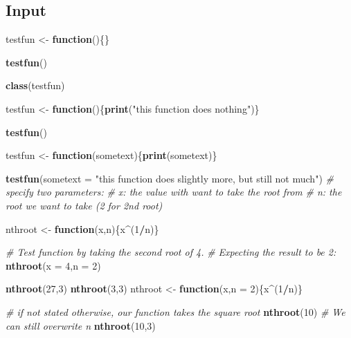 \documentclass[]{book}
\newenvironment{Shaded}{\begin{snugshade}}{\end{snugshade}}
\newcommand{\KeywordTok}[1]{\textcolor[rgb]{0.13,0.29,0.53}{\textbf{#1}}}
\newcommand{\DataTypeTok}[1]{\textcolor[rgb]{0.13,0.29,0.53}{#1}}
\newcommand{\DecValTok}[1]{\textcolor[rgb]{0.00,0.00,0.81}{#1}}
\newcommand{\StringTok}[1]{\textcolor[rgb]{0.31,0.60,0.02}{#1}}
\newcommand{\CommentTok}[1]{\textcolor[rgb]{0.56,0.35,0.01}{\textit{#1}}}
\newcommand{\ControlFlowTok}[1]{\textcolor[rgb]{0.13,0.29,0.53}{\textbf{#1}}}
\newcommand{\OperatorTok}[1]{\textcolor[rgb]{0.81,0.36,0.00}{\textbf{#1}}}
\newcommand{\NormalTok}[1]{#1}
\begin{document}
\subsection{Input}\label{input-5}

\begin{Shaded}
\begin{Highlighting}[]
\NormalTok{testfun <-}\StringTok{ }\ControlFlowTok{function}\NormalTok{()\{\}}

\KeywordTok{testfun}\NormalTok{()}

\KeywordTok{class}\NormalTok{(testfun)}

\NormalTok{testfun <-}\StringTok{ }\ControlFlowTok{function}\NormalTok{()\{}\KeywordTok{print}\NormalTok{(}\StringTok{"this function does nothing"}\NormalTok{)\}}

\KeywordTok{testfun}\NormalTok{()}

\NormalTok{testfun <-}\StringTok{ }\ControlFlowTok{function}\NormalTok{(sometext)\{}\KeywordTok{print}\NormalTok{(sometext)\}}

\KeywordTok{testfun}\NormalTok{(}\DataTypeTok{sometext =} \StringTok{"this function does slightly more, but still not much"}\NormalTok{)}
\CommentTok{# specify two parameters:}
\CommentTok{# x: the value  with want to take the root from}
\CommentTok{# n: the root we want to take (2 for 2nd root)}

\NormalTok{nthroot <-}\StringTok{ }\ControlFlowTok{function}\NormalTok{(x,n)\{x}\OperatorTok{^}\NormalTok{(}\DecValTok{1}\OperatorTok{/}\NormalTok{n)\}}

\CommentTok{# Test function by taking the second root of 4. }
\CommentTok{# Expecting the result to be 2:}
\KeywordTok{nthroot}\NormalTok{(}\DataTypeTok{x =} \DecValTok{4}\NormalTok{,}\DataTypeTok{n =} \DecValTok{2}\NormalTok{)}

\KeywordTok{nthroot}\NormalTok{(}\DecValTok{27}\NormalTok{,}\DecValTok{3}\NormalTok{)}
\KeywordTok{nthroot}\NormalTok{(}\DecValTok{3}\NormalTok{,}\DecValTok{3}\NormalTok{)}
\NormalTok{nthroot <-}\StringTok{ }\ControlFlowTok{function}\NormalTok{(x,}\DataTypeTok{n =} \DecValTok{2}\NormalTok{)\{x}\OperatorTok{^}\NormalTok{(}\DecValTok{1}\OperatorTok{/}\NormalTok{n)\}}

\CommentTok{# if not stated otherwise, our function takes the square root}
\KeywordTok{nthroot}\NormalTok{(}\DecValTok{10}\NormalTok{)}
\CommentTok{# We can still overwrite n}
\KeywordTok{nthroot}\NormalTok{(}\DecValTok{10}\NormalTok{,}\DecValTok{3}\NormalTok{)}
\end{Highlighting}
\end{Shaded}
\end{document}
